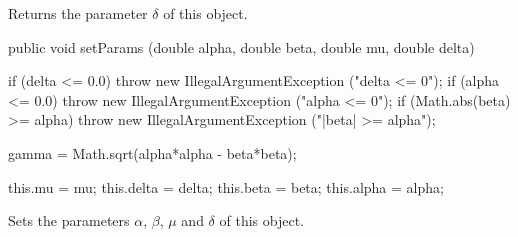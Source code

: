  \begin{tabb} Returns the parameter $\delta$ of this object.
 \end{tabb}
\begin{code}

   public void setParams (double alpha, double beta, double mu,
                          double delta)\begin{hide} {
      if (delta <= 0.0)
         throw new IllegalArgumentException ("delta <= 0");
      if (alpha <= 0.0)
         throw new IllegalArgumentException ("alpha <= 0");
      if (Math.abs(beta) >= alpha)
         throw new IllegalArgumentException ("|beta| >= alpha");

      gamma = Math.sqrt(alpha*alpha - beta*beta);

      this.mu = mu;
      this.delta = delta;
      this.beta = beta;
      this.alpha = alpha;
   }\end{hide}
\end{code}
\begin{tabb}
   Sets the parameters  $\alpha$,  $\beta$, $\mu$ and $\delta$ of this object.
\end{tabb}
\begin{code}\begin{hide} 
}
\end{hide}
\end{code}
